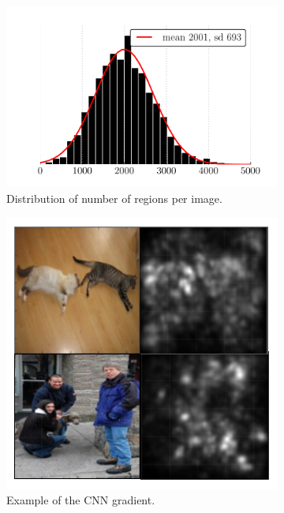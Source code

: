\begin{figure}
\centering
\begin{subfigure}[b]{0.52\linewidth}
    \includegraphics[width=\linewidth]{figures/roi_hist.pdf}
    \caption{Distribution of number of regions per image.}\label{fig:roi_hist}
\end{subfigure}\hfill
\begin{subfigure}[b]{0.46\linewidth}
    \includegraphics[width=\linewidth]{figures/gradient.pdf}
    \caption{Example of the CNN gradient.}\label{fig:gradient}
\end{subfigure}
\caption{}
\end{figure}
